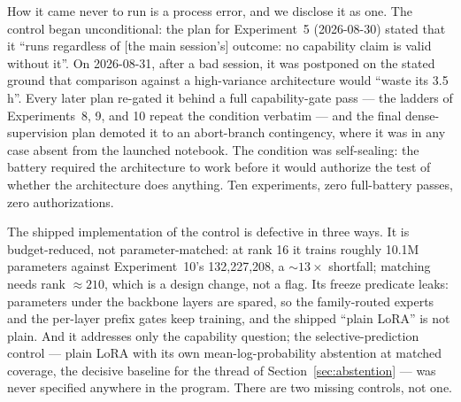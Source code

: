 \documentclass[10pt,a4paper]{article}
\begin{document}
How it came never to run is a process error, and we disclose it as one. The control began unconditional: the plan for Experiment~5 (2026-08-30) stated that it ``runs regardless of [the main session's] outcome: no capability claim is valid without it''. On 2026-08-31, after a bad session, it was postponed on the stated ground that comparison against a high-variance architecture would ``waste its 3.5\,h''. Every later plan re-gated it behind a full capability-gate pass --- the ladders of Experiments~8, 9, and 10 repeat the condition verbatim --- and the final dense-supervision plan demoted it to an abort-branch contingency, where it was in any case absent from the launched notebook. The condition was self-sealing: the battery required the architecture to work before it would authorize the test of whether the architecture does anything. Ten experiments, zero full-battery passes, zero authorizations.

The shipped implementation of the control is defective in three ways. It is budget-reduced, not parameter-matched: at rank 16 it trains roughly 10.1M parameters against Experiment~10's 132,227,208, a ${\sim}13\times$ shortfall; matching needs rank ${\approx}210$, which is a design change, not a flag. Its freeze predicate leaks: parameters under the backbone layers are spared, so the family-routed experts and the per-layer prefix gates keep training, and the shipped ``plain LoRA'' is not plain. And it addresses only the capability question; the selective-prediction control --- plain LoRA with its own mean-log-probability abstention at matched coverage, the decisive baseline for the thread of Section~\ref{sec:abstention} --- was never specified anywhere in the program. There are two missing controls, not one.
\end{document}
